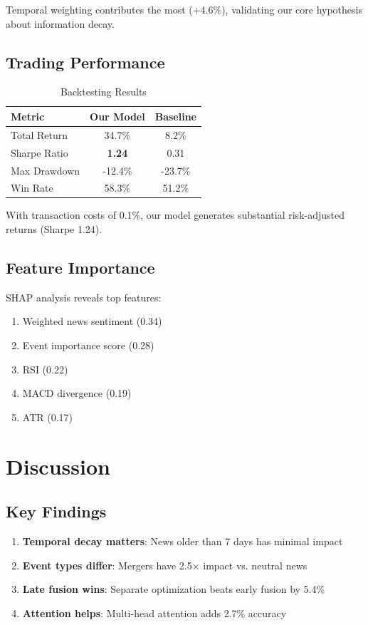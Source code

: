 \documentclass[conference]{IEEEtran}
\begin{document}
Temporal weighting contributes the most (+4.6\%), validating our core hypothesis about information decay.

\subsection{Trading Performance}

\begin{table}[ht]
\centering
\caption{Backtesting Results}
\begin{tabular}{|l|c|c|}
\hline
\textbf{Metric} & \textbf{Our Model} & \textbf{Baseline} \\
\hline
Total Return & 34.7\% & 8.2\% \\
Sharpe Ratio & \textbf{1.24} & 0.31 \\
Max Drawdown & -12.4\% & -23.7\% \\
Win Rate & 58.3\% & 51.2\% \\
\hline
\end{tabular}
\label{tab:trading}
\end{table}

With transaction costs of 0.1\%, our model generates substantial risk-adjusted returns (Sharpe 1.24).

\subsection{Feature Importance}

SHAP analysis reveals top features:
\begin{enumerate}
    \item Weighted news sentiment (0.34)
    \item Event importance score (0.28)
    \item RSI (0.22)
    \item MACD divergence (0.19)
    \item ATR (0.17)
\end{enumerate}

\section{Discussion}

\subsection{Key Findings}

\begin{enumerate}
    \item \textbf{Temporal decay matters}: News older than 7 days has minimal impact
    \item \textbf{Event types differ}: Mergers have 2.5× impact vs. neutral news
    \item \textbf{Late fusion wins}: Separate optimization beats early fusion by 5.4\%
    \item \textbf{Attention helps}: Multi-head attention adds 2.7\% accuracy
\end{enumerate}
\end{document}
